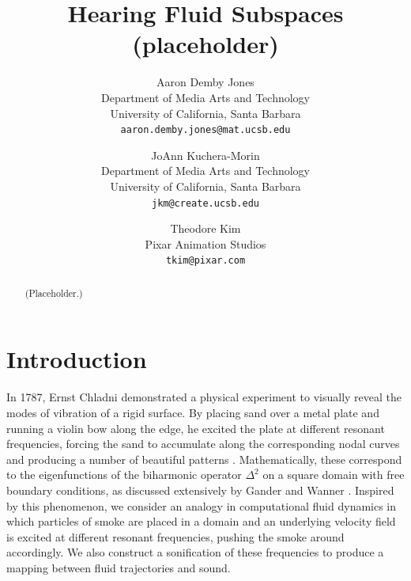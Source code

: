 \documentclass[11pt]{article}
\title{Hearing Fluid Subspaces (placeholder)}
\author{ Aaron Demby Jones\\
Department of Media Arts and Technology\\ University of California, Santa Barbara\\
{\tt aaron.demby.jones@mat.ucsb.edu}
\and
JoAnn Kuchera-Morin\\
Department of Media Arts and Technology\\ University of California, Santa Barbara\\
{\tt jkm@create.ucsb.edu}
\and
Theodore Kim\\
Pixar Animation Studios\\ 
{\tt tkim@pixar.com}
}
\date{}				%
\begin{document}
\newcommand{\UU}{\mathbf{U}}
\newcommand{\uu}{\mathbf{u}}
\newcommand{\vv}{\mathbf{v}}
\newcommand{\utilde}{\mathbf{q}}
\newcommand{\ff}{\mathbf{f}}
\newcommand{\qq}{\mathbf{q}}
\newcommand{\aaa}{\mathbf{a}}
\newcommand{\R}{\mathbb{R}}


\maketitle

\thispagestyle{empty}

\begin{abstract}
(Placeholder.)
\end{abstract}


\section*{Introduction}
In 1787, Ernst Chladni demonstrated a physical experiment to visually reveal the modes of vibration of a rigid surface. By placing sand over a metal plate and running a violin bow along the edge, he excited the plate at different resonant frequencies, forcing the sand to accumulate along the corresponding nodal curves and producing a number of beautiful patterns \cite{Chladni}. Mathematically, these correspond to the eigenfunctions of the biharmonic operator $\Delta^2$ on a square domain with free boundary conditions, as discussed extensively by Gander and Wanner \cite{gander2012euler}. Inspired by this phenomenon, we consider an analogy in computational fluid dynamics in which particles of smoke are placed in a domain and an underlying velocity field is excited at different resonant frequencies, pushing the smoke around accordingly. We also construct a sonification of these frequencies to produce a mapping between fluid trajectories and sound. 
\end{document}
